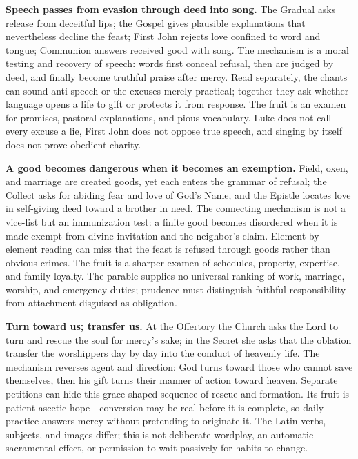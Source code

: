 \begin{deepstudy}
\noindent\textbf{Speech passes from evasion through deed into song.\enspace{}}
The Gradual asks release from deceitful lips; the Gospel gives plausible explanations that nevertheless decline the feast; First John rejects love confined to word and tongue; Communion answers received good with song. The mechanism is a moral testing and recovery of speech: words first conceal refusal, then are judged by deed, and finally become truthful praise after mercy. Read separately, the chants can sound anti-speech or the excuses merely practical; together they ask whether language opens a life to gift or protects it from response. The fruit is an examen for promises, pastoral explanations, and pious vocabulary. Luke does not call every excuse a lie, First John does not oppose true speech, and singing by itself does not prove obedient charity.

\noindent\textbf{A good becomes dangerous when it becomes an exemption.\enspace{}}
Field, oxen, and marriage are created goods, yet each enters the grammar of refusal; the Collect asks for abiding fear and love of God's Name, and the Epistle locates love in self-giving deed toward a brother in need. The connecting mechanism is not a vice-list but an immunization test: a finite good becomes disordered when it is made exempt from divine invitation and the neighbor's claim. Element-by-element reading can miss that the feast is refused through goods rather than obvious crimes. The fruit is a sharper examen of schedules, property, expertise, and family loyalty. The parable supplies no universal ranking of work, marriage, worship, and emergency duties; prudence must distinguish faithful responsibility from attachment disguised as obligation.

\noindent\textbf{Turn toward us; transfer us.\enspace{}}
At the Offertory the Church asks the Lord to turn and rescue the soul for mercy's sake; in the Secret she asks that the oblation transfer the worshippers day by day into the conduct of heavenly life. The mechanism reverses agent and direction: God turns toward those who cannot save themselves, then his gift turns their manner of action toward heaven. Separate petitions can hide this grace-shaped sequence of rescue and formation. Its fruit is patient ascetic hope---conversion may be real before it is complete, so daily practice answers mercy without pretending to originate it. The Latin verbs, subjects, and images differ; this is not deliberate wordplay, an automatic sacramental effect, or permission to wait passively for habits to change.


\end{deepstudy}
